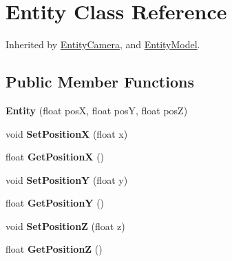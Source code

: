 \hypertarget{class_entity}{\section{Entity Class Reference}
\label{class_entity}
}


Inherited by \hyperlink{class_entity_camera}{Entity\-Camera}, and \hyperlink{class_entity_model}{Entity\-Model}.

\subsection*{Public Member Functions}
\begin{DoxyCompactItemize}
\item 
\hypertarget{class_entity_a64e4457add48fc3f3e858668ee58dcee}{{\bfseries Entity} (float pos\-X, float pos\-Y, float pos\-Z)}\label{class_entity_a64e4457add48fc3f3e858668ee58dcee}

\item 
\hypertarget{class_entity_aaf3e06bde1b09426df70a82fd33cda4c}{void {\bfseries Set\-Position\-X} (float x)}\label{class_entity_aaf3e06bde1b09426df70a82fd33cda4c}

\item 
\hypertarget{class_entity_a7b45eec5fd1c4bad68c913088fb3a580}{float {\bfseries Get\-Position\-X} ()}\label{class_entity_a7b45eec5fd1c4bad68c913088fb3a580}

\item 
\hypertarget{class_entity_ac39410e534d19ddbfb255ccdf758b1b9}{void {\bfseries Set\-Position\-Y} (float y)}\label{class_entity_ac39410e534d19ddbfb255ccdf758b1b9}

\item 
\hypertarget{class_entity_a05a8dc8fba5a84ca55f82a645f71ce69}{float {\bfseries Get\-Position\-Y} ()}\label{class_entity_a05a8dc8fba5a84ca55f82a645f71ce69}

\item 
\hypertarget{class_entity_a096584123b1047c33d253c1985401815}{void {\bfseries Set\-Position\-Z} (float z)}\label{class_entity_a096584123b1047c33d253c1985401815}

\item 
\hypertarget{class_entity_afac94b2a7de43504b1d503e07fbf55df}{float {\bfseries Get\-Position\-Z} ()}\label{class_entity_afac94b2a7de43504b1d503e07fbf55df}

\end{DoxyCompactItemize}
